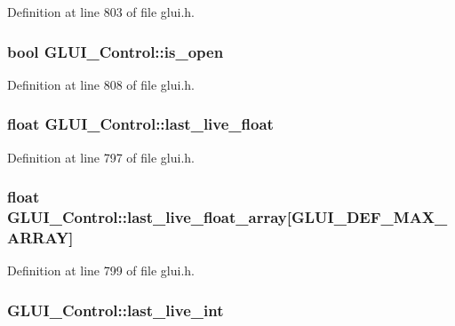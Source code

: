 Definition at line 803 of file glui.\+h.

\hypertarget{class_g_l_u_i___control_a3e4e35edfa04ce71c090bdb849b7642c}{
\subsubsection[{is\+\_\+open}]{\setlength{\rightskip}{0pt plus 5cm}bool G\+L\+U\+I\+\_\+\+Control\+::is\+\_\+open}}\label{class_g_l_u_i___control_a3e4e35edfa04ce71c090bdb849b7642c}


Definition at line 808 of file glui.\+h.

\hypertarget{class_g_l_u_i___control_aa9ebadbed670a1fa061918705083db57}{
\subsubsection[{last\+\_\+live\+\_\+float}]{\setlength{\rightskip}{0pt plus 5cm}float G\+L\+U\+I\+\_\+\+Control\+::last\+\_\+live\+\_\+float}}\label{class_g_l_u_i___control_aa9ebadbed670a1fa061918705083db57}


Definition at line 797 of file glui.\+h.

\hypertarget{class_g_l_u_i___control_a719177af6b52ae3373d2b3c30430ff58}{
\subsubsection[{last\+\_\+live\+\_\+float\+\_\+array}]{\setlength{\rightskip}{0pt plus 5cm}float G\+L\+U\+I\+\_\+\+Control\+::last\+\_\+live\+\_\+float\+\_\+array\mbox{[}{\bf G\+L\+U\+I\+\_\+\+D\+E\+F\+\_\+\+M\+A\+X\+\_\+\+A\+R\+R\+A\+Y}\mbox{]}}}\label{class_g_l_u_i___control_a719177af6b52ae3373d2b3c30430ff58}


Definition at line 799 of file glui.\+h.

\hypertarget{class_g_l_u_i___control_abef31d8d51c8088afd6ac96ec7b596bf}{
\subsubsection[{last\+\_\+live\+\_\+int}]{ G\+L\+U\+I\+\_\+\+Control\+::last\+\_\+live\+\_\+int}}\label{class_g_l_u_i___control_abef31d8d51c8088afd6ac96ec7b596bf}


